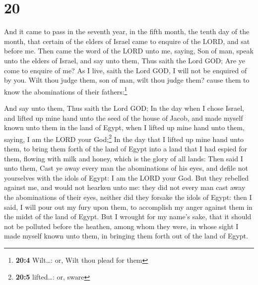 \hypertarget{section-19}{%
\section{20}\label{section-19}}

 And it came to pass in the seventh year, in the fifth
month, the tenth day of the month, that certain of the elders of Israel
came to enquire of the LORD, and sat before me.  Then came
the word of the LORD unto me, saying,  Son of man, speak
unto the elders of Israel, and say unto them, Thus saith the Lord GOD;
Are ye come to enquire of me? As I live, saith the Lord GOD, I will not
be enquired of by you.  Wilt thou judge them, son of man,
wilt thou judge them? cause them to know the abominations of their
fathers:\footnote{\textbf{20:4} Wilt\ldots: or, Wilt thou plead for them}

 And say unto them, Thus saith the Lord GOD; In the day
when I chose Israel, and lifted up mine hand unto the seed of the house
of Jacob, and made myself known unto them in the land of Egypt, when I
lifted up mine hand unto them, saying, I am the LORD your
God;\footnote{\textbf{20:5} lifted\ldots: or, sware}  In
the day that I lifted up mine hand unto them, to bring them forth of the
land of Egypt into a land that I had espied for them, flowing with milk
and honey, which is the glory of all lands:  Then said I
unto them, Cast ye away every man the abominations of his eyes, and
defile not yourselves with the idols of Egypt: I am the LORD your God.
 But they rebelled against me, and would not hearken unto
me: they did not every man cast away the abominations of their eyes,
neither did they forsake the idols of Egypt: then I said, I will pour
out my fury upon them, to accomplish my anger against them in the midst
of the land of Egypt.  But I wrought for my name's sake,
that it should not be polluted before the heathen, among whom they were,
in whose sight I made myself known unto them, in bringing them forth out
of the land of Egypt.

